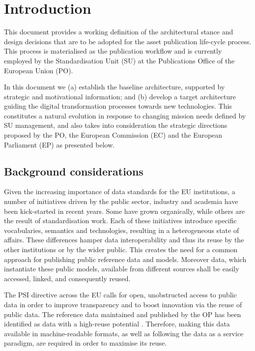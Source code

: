 \chapter{Introduction}
\label{sec:introduction}
	
	This document provides a working definition of the architectural stance and design decisions that are to be adopted for the asset publication life-cycle process. This process is materialised as the publication workflow and is currently employed by the Standardisation Unit (SU) at the Publications Office of the European Union (PO).
	
	In this document we (a) establish the baseline architecture, supported by  strategic and motivational information; and (b) develop a target architecture guiding the digital transformation processes towards new technologies. This constitutes a natural evolution in response to changing mission needs defined by SU management, and also takes into consideration the strategic directions proposed by the PO, the European Commission (EC) and the European Parliament (EP) as presented below.
	
	\section{Background considerations}
	
	Given the increasing importance of data standards for the EU institutions, a number of initiatives driven by the public sector, industry and academia have been kick-started in recent years. Some have grown organically, while others are the result of standardisation work. Each of these initiatives introduce specific vocabularies, semantics and technologies, resulting in a heterogeneous state of affairs. These differences hamper data interoperability and thus its reuse by the other institutions or by the wider public. This creates the need for a common approach for publishing public reference data and models. Moreover data, which instantiate these public models, available from different sources shall be easily accessed, linked, and consequently reused.
	
	
	The PSI directive \cite{directive-2019/1024} across the EU calls for open, unobstructed access to public data in order to improve transparency and to boost innovation via the reuse of public data. The reference data maintained and published by the OP has been identified as data with a high-reuse potential \cite{d-high-value-assets}. Therefore, making this data available in machine-readable formats, as well as following the data as a service paradigm, are required in order to maximise its reuse.
	

